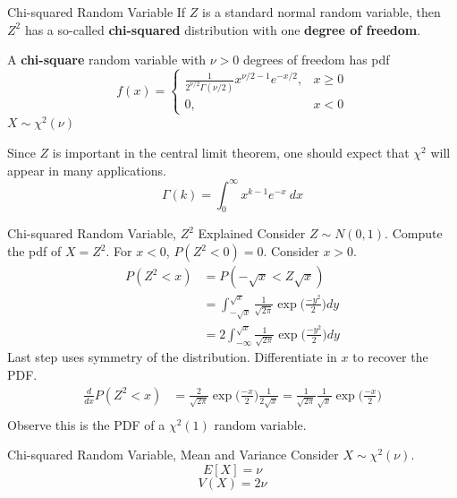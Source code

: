 \documentclass[]{beamer}
\begin{document}
\begin{frame}{Chi-squared Random Variable}
    If $Z$ is a standard normal random variable, then $Z^2$ has a so-called \textbf{chi-squared} distribution with one \textbf{degree of freedom}.

    \begin{block}{}
        A \textbf{chi-square} random variable with $\nu>0$ degrees of freedom has pdf
        $$f(x) = \begin{cases}\frac1{2^{\nu/2}\Gamma(\nu/2)}x^{\nu/2-1}e^{-x/2},& x\geq 0 \\ 0, & x<0\end{cases}$$
        $X \sim \chi^2(\nu)$
    \end{block}
    Since $Z$ is important in the central limit theorem, one should expect that $\chi^2$ will appear in many applications.
    $$\Gamma(k) = \int_0^\infty x^{k-1}e^{-x}\ dx$$
\end{frame}
\begin{frame}{Chi-squared Random Variable, $Z^2$ Explained}
    Consider $Z\sim N(0,1)$. Compute the pdf of $X= Z^2$.
    For $x<0$, $ P(Z^2<0)=0$.
    Consider $x>0$.
    \pause
    \begin{align*}
        P(Z^2<x) & = P(-\sqrt{x}<Z \sqrt{x})                                                             \\
                 & = \int_{-\sqrt{x}}^{\sqrt{x}} \frac{1}{\sqrt{2\pi}} \exp\bigg(\frac{-y^2}{2}\bigg) dy \\
                 & = 2 \int_{-\infty}^{\sqrt{x}} \frac{1}{\sqrt{2\pi}} \exp\bigg(\frac{-y^2}{2}\bigg) dy
    \end{align*}
    \pause Last step uses symmetry of the distribution. Differentiate in $x$ to recover the PDF.
    \pause
    \begin{align*}
        \frac{d}{dx} P(Z^2 < x) & = \frac{2}{\sqrt{2\pi}}\exp\bigg(\frac{-x}{2}\bigg)\frac{1}{2\sqrt{x}} = \frac{1}{\sqrt{2\pi}}\frac{1}{\sqrt{x}}\exp\bigg(\frac{-x}{2}\bigg) \\
    \end{align*}
    Observe this is the PDF of a $\chi^2(1)$ random variable.
\end{frame}
\begin{frame}{Chi-squared Random Variable, Mean and Variance}
    Consider $X\sim \chi^2(\nu)$.
    $$E[X] = \nu$$
    $$ V(X) = 2\nu $$
    \vfill
\end{frame}
\end{document}
